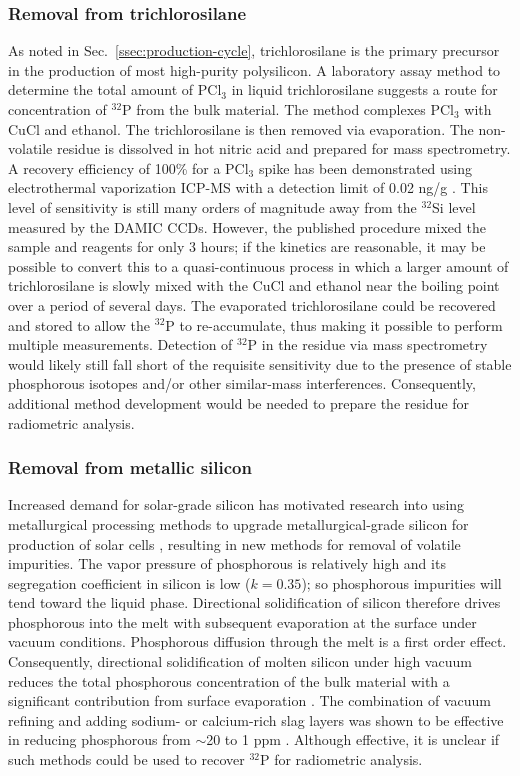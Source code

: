 \documentclass[final,5p]{elsarticle}
\def\si{$^{32}$Si\xspace}
\def\p{$^{32}$P\xspace}
\begin{document}
\subsubsection{Removal from trichlorosilane}\label{sssec:trichlorosilane}
As noted in Sec.\ \ref{ssec:production-cycle}, trichlorosilane is the primary precursor in the production of most high-purity polysilicon.  A laboratory assay method to determine the total amount of PCl$_3$ in liquid trichlorosilane suggests a route for concentration of \p from the bulk material.  The method complexes PCl$_3$ with CuCl and ethanol.  The trichlorosilane is then removed via evaporation.  The non-volatile residue is dissolved in hot nitric acid and prepared for mass spectrometry.  A recovery efficiency of 100\% for a PCl$_3$ spike has been demonstrated using electrothermal vaporization ICP-MS with a detection limit of 0.02 ng/g \cite{wei}. This level of sensitivity is still many orders of magnitude away from the \si level measured by the DAMIC CCDs.  However, the published procedure mixed the sample and reagents for only 3 hours; if the kinetics are reasonable, it may be possible to convert this to a quasi-continuous process in which a larger amount of trichlorosilane is slowly mixed with the CuCl and ethanol near the boiling point over a period of several days.  The evaporated trichlorosilane could be recovered and stored to allow the \p to re-accumulate, thus making it possible to perform multiple measurements. Detection of \p in the residue via mass spectrometry would likely still fall short of the requisite sensitivity due to the presence of stable phosphorous isotopes and/or other similar-mass interferences.  Consequently, additional method development would be needed to prepare the residue for radiometric analysis.

\subsubsection{Removal from metallic silicon}\label{sssec:metalic_si}
Increased demand for solar-grade silicon has motivated research into using metallurgical processing methods to upgrade metallurgical-grade silicon for production of solar cells \cite{Safarian}, resulting in new methods for removal of volatile impurities. The vapor pressure of phosphorous is relatively high and its segregation coefficient in silicon is low ($k=0.35$); so phosphorous impurities will tend toward the liquid phase.  Directional solidification of silicon therefore drives phosphorous into the melt with subsequent evaporation at the surface under vacuum conditions.  Phosphorous diffusion through the melt is a first order effect.  Consequently, directional solidification of molten silicon under high vacuum reduces the total phosphorous concentration of the bulk material with a significant contribution from surface evaporation \cite{Jiang}. The combination of vacuum refining and adding sodium- or calcium-rich slag layers was shown to be effective in reducing phosphorous from $\sim$20 to 1 ppm \cite{Huang}.  Although effective, it is unclear if such methods could be used to recover \p for radiometric analysis.
\end{document}
